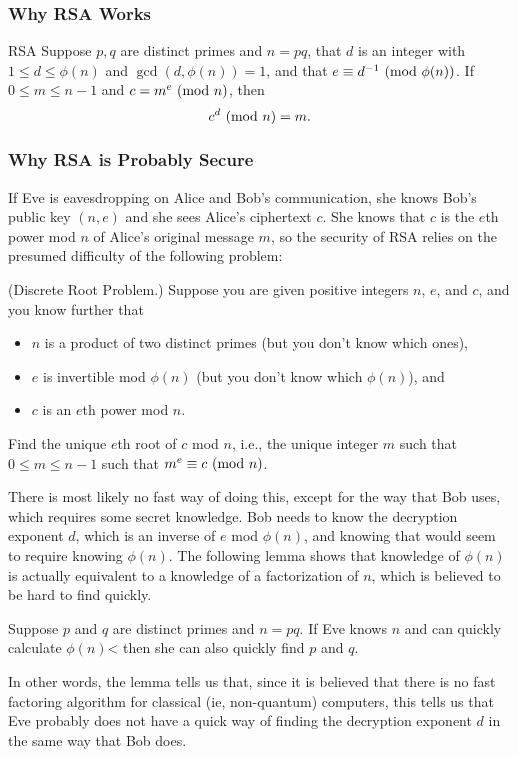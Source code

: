 \documentclass[letterpaper]{article}
\begin{document}
\subsubsection{Why RSA Works}
\begin{theorem}{RSA}{}
    Suppose $p, q$ are distinct primes and $n = pq$, that $d$ is an integer with $1 \leq d \leq \phi(n)$ and $\gcd(d, \phi(n)) = 1$, and that $e \equiv d^{-1} \ (\mathrm{mod}\ \phi(n))$. If $0 \leq m \leq n - 1$ and $c = m^e \ (\mathrm{mod}\ n)$, then \[c^d \ (\mathrm{mod}\ n) = m.\]
\end{theorem}


\subsubsection{Why RSA is Probably Secure}
If Eve is eavesdropping on Alice and Bob's communication, she knows Bob's public key $(n, e)$ and she sees Alice's ciphertext $c$. She knows that $c$ is the $e$th power mod $n$ of Alice's original message $m$, so the security of RSA relies on the presumed difficulty of the following problem: 
\begin{mdframed}
    (Discrete Root Problem.) Suppose you are given positive integers $n$, $e$, and $c$, and you know further that 
    \begin{itemize}
        \item $n$ is a product of two distinct primes (but you don't know which ones),
        \item $e$ is invertible mod $\phi(n)$ (but you don't know which $\phi(n)$), and 
        \item $c$ is an $e$th power mod $n$.
    \end{itemize}
    Find the unique $e$th root of $c$ mod $n$, i.e., the unique integer $m$ such that $0 \leq m \leq n - 1$ such that $m^e \equiv c \ (\mathrm{mod}\ n)$. 
\end{mdframed}
There is most likely no fast way of doing this, except for the way that Bob uses, which requires some secret knowledge. Bob needs to know the decryption exponent $d$, which is an inverse of $e$ mod $\phi(n)$, and knowing that would seem to require knowing $\phi(n)$. The following lemma shows that knowledge of $\phi(n)$ is actually equivalent to a knowledge of a factorization of $n$, which is believed to be hard to find quickly. 

\begin{lemma}{}{}
    Suppose $p$ and $q$ are distinct primes and $n = pq$. If Eve knows $n$ and can quickly calculate $\phi(n)$< then she can also quickly find $p$ and $q$. 
\end{lemma}
In other words, the lemma tells us that, since it is believed that there is no fast factoring algorithm for classical (ie, non-quantum) computers, this tells us that Eve probably does not have a quick way of finding the decryption exponent $d$ in the same way that Bob does. 
\end{document}
